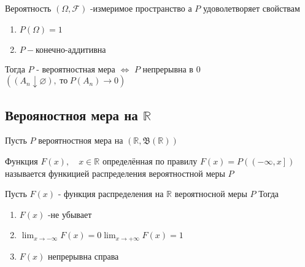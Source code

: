 \begin{theorem}
	Вероятность $ (\Omega, \mathcal{F})$ -измеримое пространство а $ P $ удоволетворяет свойствам 
	\begin{enumerate}
		\item $ P(\Omega) = 1 $
		\item $ P - \text{конечно-аддитивна} $
	\end{enumerate}	

Тогда $ P $ - вероятностная мера $\Longleftrightarrow$ $ P $ непрерывна в $ 0 $ $ \left((A_{n} \downarrow \varnothing),\hspace{3pt} \text{то} \hspace{3pt} P\left(A_{n}\right) \rightarrow 0\right) $
\end{theorem}

\subsection{Верояностноя мера на $\mathbb{R}$}
Пусть $ P $  вероятностноя мера на $(\mathbb{R}, \mathfrak{B}(\mathbb{R}))$
\begin{definition}
Функция $ F(x), \quad x\in \mathbb{R}  $ определённая по правилу
$F(x)=P\left(\left(-\infty, x\right]\right)$ называется функицией распределения вероятностной меры $ P $
\end{definition}
\begin{lemma}
	Пусть $F(x)$ - функция распределения на $ \mathbb{R} $ вероятносной меры $ P $
	Тогда 
	\begin{enumerate}
		\item	$ F(x) $ -не убывает
		\item $\displaystyle \lim _{x \rightarrow-\infty} F(x)=0 \lim _{x \rightarrow+\infty} F(x)=1$
		\item $ F(x) $ непрерывна справа		
	\end{enumerate}
	
\end{lemma}

